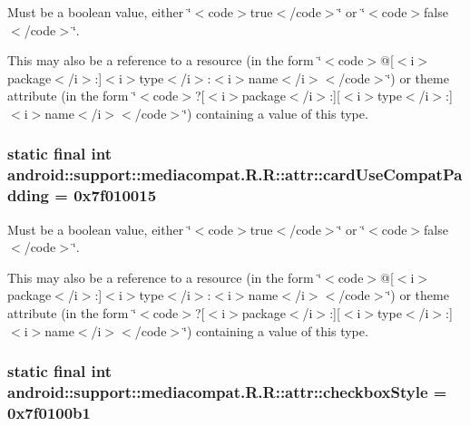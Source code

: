 Must be a boolean value, either \char`\"{}$<$code$>$true$<$/code$>$\char`\"{} or \char`\"{}$<$code$>$false$<$/code$>$\char`\"{}. 

This may also be a reference to a resource (in the form \char`\"{}$<$code$>$@\mbox{[}$<$i$>$package$<$/i$>$:\mbox{]}$<$i$>$type$<$/i$>$:$<$i$>$name$<$/i$>$$<$/code$>$\char`\"{}) or theme attribute (in the form \char`\"{}$<$code$>$?\mbox{[}$<$i$>$package$<$/i$>$:\mbox{]}\mbox{[}$<$i$>$type$<$/i$>$:\mbox{]}$<$i$>$name$<$/i$>$$<$/code$>$\char`\"{}) containing a value of this type. \hypertarget{classandroid_1_1support_1_1mediacompat_1_1_r_1_1attr_72801d773da6ebeb3edddd5f7eed5aab}{
\subsubsection[{cardUseCompatPadding}]{\setlength{\rightskip}{0pt plus 5cm}static final int android::support::mediacompat.R.R::attr::cardUseCompatPadding = 0x7f010015}}
\label{classandroid_1_1support_1_1mediacompat_1_1_r_1_1attr_72801d773da6ebeb3edddd5f7eed5aab}


Must be a boolean value, either \char`\"{}$<$code$>$true$<$/code$>$\char`\"{} or \char`\"{}$<$code$>$false$<$/code$>$\char`\"{}. 

This may also be a reference to a resource (in the form \char`\"{}$<$code$>$@\mbox{[}$<$i$>$package$<$/i$>$:\mbox{]}$<$i$>$type$<$/i$>$:$<$i$>$name$<$/i$>$$<$/code$>$\char`\"{}) or theme attribute (in the form \char`\"{}$<$code$>$?\mbox{[}$<$i$>$package$<$/i$>$:\mbox{]}\mbox{[}$<$i$>$type$<$/i$>$:\mbox{]}$<$i$>$name$<$/i$>$$<$/code$>$\char`\"{}) containing a value of this type. \hypertarget{classandroid_1_1support_1_1mediacompat_1_1_r_1_1attr_06ad276e2da98ac479ac37f96c09ec20}{
\subsubsection[{checkboxStyle}]{\setlength{\rightskip}{0pt plus 5cm}static final int android::support::mediacompat.R.R::attr::checkboxStyle = 0x7f0100b1}}
\label{classandroid_1_1support_1_1mediacompat_1_1_r_1_1attr_06ad276e2da98ac479ac37f96c09ec20}


